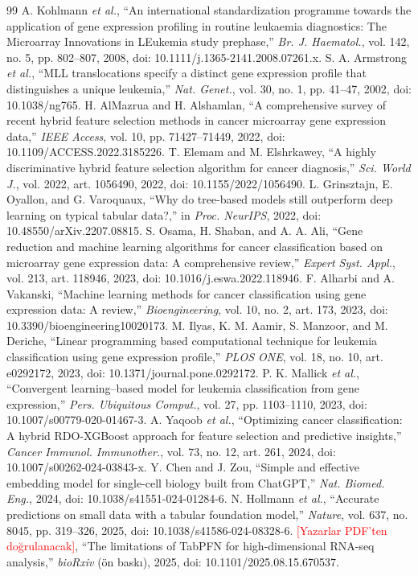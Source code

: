 \documentclass[conference]{IEEEtran}
\newcommand{\todo}[1]{\textcolor{red}{[#1]}}
\begin{document}
\begin{thebibliography}{99}
 A. Kohlmann \textit{et al.}, ``An international standardization programme towards the application of gene expression profiling in routine leukaemia diagnostics: The Microarray Innovations in LEukemia study prephase,'' \textit{Br. J. Haematol.}, vol. 142, no. 5, pp. 802--807, 2008, doi: 10.1111/j.1365-2141.2008.07261.x.
 S. A. Armstrong \textit{et al.}, ``MLL translocations specify a distinct gene expression profile that distinguishes a unique leukemia,'' \textit{Nat. Genet.}, vol. 30, no. 1, pp. 41--47, 2002, doi: 10.1038/ng765.
 H. AlMazrua and H. Alshamlan, ``A comprehensive survey of recent hybrid feature selection methods in cancer microarray gene expression data,'' \textit{IEEE Access}, vol. 10, pp. 71427--71449, 2022, doi: 10.1109/ACCESS.2022.3185226.
 T. Elemam and M. Elshrkawey, ``A highly discriminative hybrid feature selection algorithm for cancer diagnosis,'' \textit{Sci. World J.}, vol. 2022, art. 1056490, 2022, doi: 10.1155/2022/1056490.
 L. Grinsztajn, E. Oyallon, and G. Varoquaux, ``Why do tree-based models still outperform deep learning on typical tabular data?,'' in \textit{Proc. NeurIPS}, 2022, doi: 10.48550/arXiv.2207.08815.
 S. Osama, H. Shaban, and A. A. Ali, ``Gene reduction and machine learning algorithms for cancer classification based on microarray gene expression data: A comprehensive review,'' \textit{Expert Syst. Appl.}, vol. 213, art. 118946, 2023, doi: 10.1016/j.eswa.2022.118946.
 F. Alharbi and A. Vakanski, ``Machine learning methods for cancer classification using gene expression data: A review,'' \textit{Bioengineering}, vol. 10, no. 2, art. 173, 2023, doi: 10.3390/bioengineering10020173.
 M. Ilyas, K. M. Aamir, S. Manzoor, and M. Deriche, ``Linear programming based computational technique for leukemia classification using gene expression profile,'' \textit{PLOS ONE}, vol. 18, no. 10, art. e0292172, 2023, doi: 10.1371/journal.pone.0292172.
 P. K. Mallick \textit{et al.}, ``Convergent learning--based model for leukemia classification from gene expression,'' \textit{Pers. Ubiquitous Comput.}, vol. 27, pp. 1103--1110, 2023, doi: 10.1007/s00779-020-01467-3.
 A. Yaqoob \textit{et al.}, ``Optimizing cancer classification: A hybrid RDO-XGBoost approach for feature selection and predictive insights,'' \textit{Cancer Immunol. Immunother.}, vol. 73, no. 12, art. 261, 2024, doi: 10.1007/s00262-024-03843-x.
 Y. Chen and J. Zou, ``Simple and effective embedding model for single-cell biology built from ChatGPT,'' \textit{Nat. Biomed. Eng.}, 2024, doi: 10.1038/s41551-024-01284-6.
 N. Hollmann \textit{et al.}, ``Accurate predictions on small data with a tabular foundation model,'' \textit{Nature}, vol. 637, no. 8045, pp. 319--326, 2025, doi: 10.1038/s41586-024-08328-6.
 \todo{Yazarlar PDF'ten doğrulanacak}, ``The limitations of TabPFN for high-dimensional RNA-seq analysis,'' \textit{bioRxiv} (ön baskı), 2025, doi: 10.1101/2025.08.15.670537.
\end{thebibliography}
\end{document}

